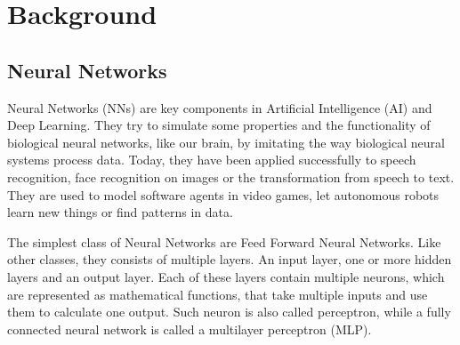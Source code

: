 \chapter{Background}

  \section{Neural Networks}

    Neural Networks (NNs) are key components in Artificial Intelligence (AI) and Deep Learning.
    They try to simulate some properties and the functionality of biological neural networks, like our brain, by imitating the way biological neural systems process data.
    Today, they have been applied successfully to speech recognition, face recognition on images or the transformation from speech to text.
    They are used to model software agents in video games, let autonomous robots learn new things or find patterns in data.

    The simplest class of Neural Networks are Feed Forward Neural Networks.
    Like other classes, they consists of multiple layers.
    An input layer, one or more hidden layers and an output layer.
    Each of these layers contain multiple neurons, which are represented as mathematical functions, that take multiple inputs and use them to calculate one output.
    Such neuron is also called perceptron, while a fully connected neural network is called a multilayer perceptron (MLP).

